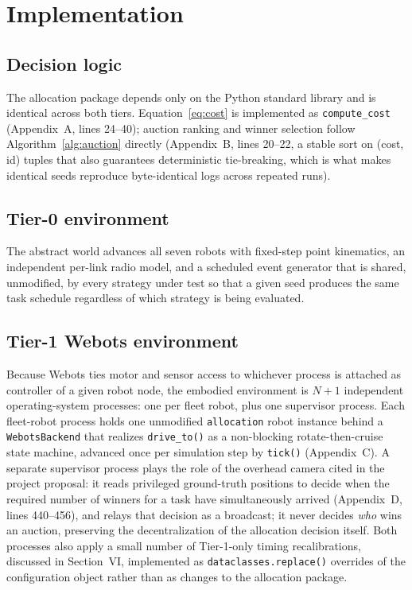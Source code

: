 \documentclass[conference]{IEEEtran}
\begin{document}
\section{Implementation}

\subsection{Decision logic}

The allocation package depends only on the Python standard library and is
identical across both tiers. Equation~\eqref{eq:cost} is implemented as
\texttt{compute\_cost} (Appendix~A, lines 24--40); auction ranking and
winner selection follow Algorithm~\ref{alg:auction} directly
(Appendix~B, lines 20--22, a stable sort on (cost, id) tuples that also
guarantees deterministic tie-breaking, which is what makes identical
seeds reproduce byte-identical logs across repeated runs).

\subsection{Tier-0 environment}

The abstract world advances all seven robots with fixed-step point
kinematics, an independent per-link radio model, and a scheduled event
generator that is shared, unmodified, by every strategy under test so
that a given seed produces the same task schedule regardless of which
strategy is being evaluated.

\subsection{Tier-1 Webots environment}

Because Webots ties motor and sensor access to whichever process is
attached as controller of a given robot node, the embodied environment is
$N{+}1$ independent operating-system processes: one per fleet robot, plus
one supervisor process. Each fleet-robot process holds one unmodified
\texttt{allocation} robot instance behind a \texttt{WebotsBackend} that
realizes \texttt{drive\_to()} as a non-blocking rotate-then-cruise state
machine, advanced once per simulation step by \texttt{tick()}
(Appendix~C). A separate supervisor process plays the role of the
overhead camera cited in the project proposal: it reads privileged
ground-truth positions to decide when the required number of winners for
a task have simultaneously arrived (Appendix~D, lines 440--456), and
relays that decision as a broadcast; it never decides \emph{who} wins an
auction, preserving the decentralization of the allocation decision
itself. Both processes also apply a small number of Tier-1-only timing
recalibrations, discussed in Section~VI, implemented as
\texttt{dataclasses.replace()} overrides of the configuration object
rather than as changes to the allocation package.
\end{document}
